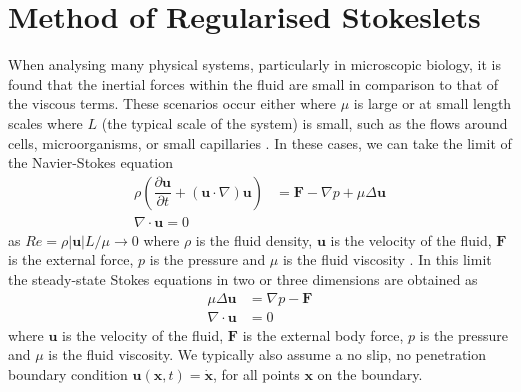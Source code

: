 \FloatBarrier
\section{Method of Regularised Stokeslets} \label{sec:MRS}

When analysing many physical systems, particularly in microscopic biology, it is found that the inertial forces within the fluid are small in comparison to that of the viscous terms. These scenarios occur either where $\mu$ is large or at small length scales where $L$ (the typical scale of the system) is small, such as the flows around cells, microorganisms, or small capillaries \cite{Blake1972AOrganisms, Higdon1979APropulsion, Smith2009MathematicalFluids}.
In these cases, we can take the limit of the Navier-Stokes equation 
\begin{equation}
\label{eq:NavierStokes}
\begin{aligned}
    \rho \left(\dfrac{\partial \bm{u}}{\partial t}+(\bm{u} \cdot \nabla) \bm{u}\right) &= \bm{F}-\nabla p+\mu  \Delta \bm{u}\\
    \nabla\cdot\bm{u} = 0
\end{aligned}
\end{equation}
as $Re=\rho |\bm{u}| L/\mu \to 0$ where 
$\rho$ is the fluid density, $\mathbf{u}$ is the velocity of the fluid, $\mathbf{F}$ is the external force, $p$ is the pressure and $\mu$ is the fluid viscosity \cite{Trombley2019BasicFlows}.
In this limit the steady-state Stokes equations in two or three dimensions are obtained as 
\begin{subequations}
\label{eq:StokesFlow}
\begin{align}
    \mu\Delta\bm{u} &= \nabla p - \bm{F} \label{eq:StokesFlow1} \\
    \nabla \cdot \bm{u} &= 0 \label{eq:StokesFlow2}
\end{align}
\end{subequations}
where $\bm{u}$ is the velocity of the fluid, $\bm{F}$ is the external body force, $p$ is the pressure and $\mu$ is the fluid viscosity. We typically also assume a no slip, no penetration boundary condition $\bm{u}(\bm{x},t)=\dot{\bm{x}}$, for all points $\bm{x}$ on the boundary. 

